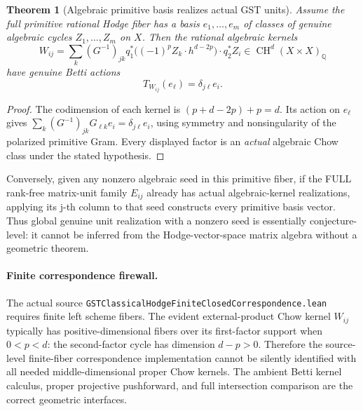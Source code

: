 \documentclass[11pt,a4paper]{article}
\newtheorem{theorem}{Theorem}[section]
\newcommand{\Q}{\mathbb Q}
\newcommand{\CH}{\operatorname{CH}}
\begin{document}
\begin{theorem}[Algebraic primitive basis realizes actual GST units]
\label{th:units}
Assume the full primitive rational Hodge fiber has a
basis \(e_1,\ldots,e_m\) of classes of genuine algebraic cycles
\(Z_1,\ldots,Z_m\) on \(X\). Then the rational algebraic kernels
\[
 W_{ij}=\sum_k(G^{-1})_{jk}
 q_1^*\bigl((-1)^pZ_k\cdot h^{d-2p}\bigr)
 \cdot q_2^*Z_i\in\CH^d(X\times X)_\Q
 \tag{6.3}
\]
have genuine Betti actions
\[
                  T_{W_{ij}}(e_\ell)=\delta_{j\ell}e_i.
                  \tag{6.4}
\]
\end{theorem}
\begin{proof}
The codimension of each kernel is
\((p+d-2p)+p=d\).  Its action on \(e_\ell\) gives
\(\sum_k(G^{-1})_{jk}G_{\ell k}e_i
=\delta_{j\ell}e_i\), using symmetry
and nonsingularity of the polarized primitive Gram.
Every displayed factor is an \emph{actual} algebraic
Chow class under the stated hypothesis.
\end{proof}
Conversely, given any nonzero algebraic seed in this
primitive fiber, if the FULL rank-free matrix-unit
family \(E_{ij}\) already has actual algebraic-kernel
realizations, applying its j-th column to that seed
constructs every primitive basis vector.
Thus global genuine unit realization with a nonzero
seed is essentially conjecture-level: it cannot be
inferred from the Hodge-vector-space matrix algebra
without a geometric theorem.

\paragraph{Finite correspondence firewall.}
The actual source
\texttt{GSTClassicalHodgeFiniteClosedCorrespondence.lean}
requires finite left scheme fibers.  The evident
external-product Chow kernel \(W_{ij}\) typically has
positive-dimensional fibers over its first-factor
support when \(0<p<d\): the second-factor cycle has
dimension \(d-p>0\).  Therefore the source-level
finite-fiber correspondence implementation cannot be
silently identified with all needed middle-dimensional
proper Chow kernels.  The ambient Betti kernel calculus,
proper projective pushforward, and full intersection
comparison are the correct geometric interfaces.
\end{document}
